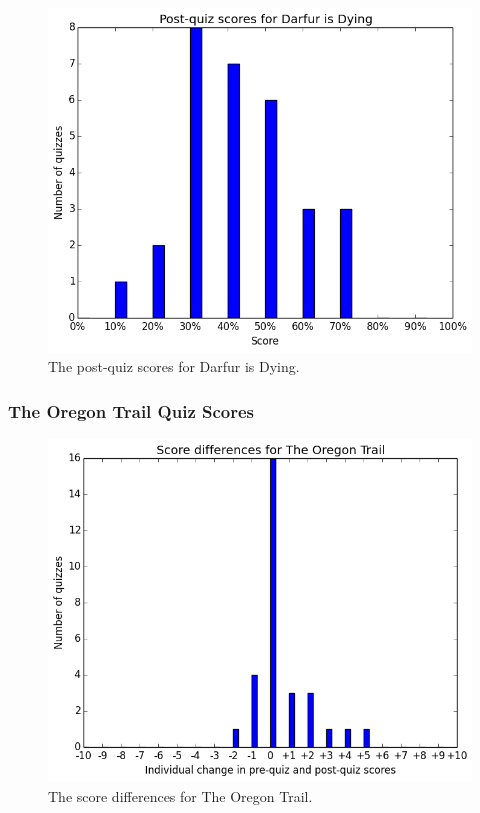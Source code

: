 			\begin{figure}[h!] 
			\centering 
			\includegraphics[height=0.33\textheight]{darfur_post.png} 
			\caption{The post-quiz scores for Darfur is Dying.}
			\end{figure}


\cleardoublepage

		\subsubsection{The Oregon Trail Quiz Scores}

			\begin{figure}[h!] 
			\centering 
			\includegraphics[height=0.33\textheight]{oregon_results.png} 
			\caption{The score differences for The Oregon Trail.}
			\end{figure}

